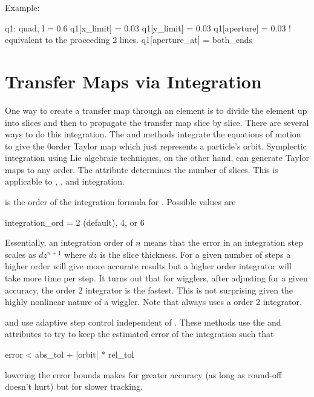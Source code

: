 Example:
\begin{example}
  q1: quad, l = 0.6
  q1[x_limit] = 0.03
  q1[y_limit] = 0.03
  q1[aperture] = 0.03  ! equivalent to the proceeding 2 lines.  
  q1[aperture_at] = both_ends
\end{example}

\section{Transfer Maps via Integration}
\label{s:integ}

One way to create a transfer map through an element is to divide the
element up into slices and then to propagate the transfer map slice by
slice.  There are several ways to do this integration. The  and
 methods integrate the equations of motion to give the
0\Th order Taylor map which just represents a particle's orbit.  Symplectic
integration
using Lie algebraic techniques, on the other hand, can
generate Taylor maps to any order.  The  attribute determines
the number of slices. This is applicable to ,
, and  integration.

 is the order of the integration formula for 
. Possible values are
\begin{example}
  integration_ord = 2 (default), 4, or 6
\end{example}
Essentially, an integration order of $n$ means that the error in an 
integration step scales as $dz^{n+1}$ where $dz$ is the slice thickness.
For a given number of steps a higher order will give more accurate results
but a higher order integrator will take more time per step. It turns out
that for wigglers, after adjusting  for a given accuracy, 
the order 2 integrator is the fastest. This is not surprising given the
highly nonlinear nature of a wiggler. Note that  always
uses a order 2 integrator.

 and  use adaptive step
control independent of . These methods use the  and
 attributes to try to keep the estimated error of the integration
such that
\begin{example}
  error < abs_tol + |orbit| * rel_tol
\end{example}
lowering the error bounds makes for greater accuracy (as long as round-off 
doesn't hurt) but for slower tracking. 

